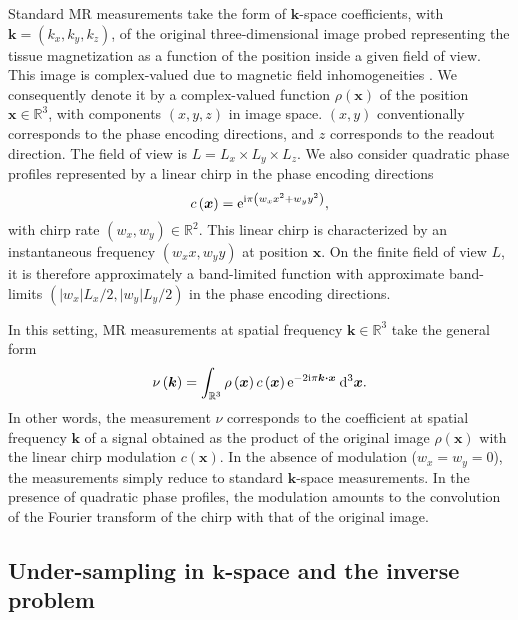\documentclass[10pt,draftcls, onecolumn]{IEEEtran}
\begin{document}
Standard MR measurements take the form of  $\bm{k}$-space coefficients, with $\bm{k}=(k_x, k_y, k_z)$, of the original three-dimensional image probed representing the tissue magnetization as a function of the position inside a given field of view. This image is complex-valued due to magnetic field inhomogeneities \cite{haake99}. We consequently denote it by a complex-valued function $\rho(\bm{x})$ of the position $\bm{x}\in\mathbb{R}^{3}$, with components $(x,y,z)$ in image space. $(x,y)$ conventionally corresponds to the phase encoding directions, and $z$ corresponds to the readout direction. The field of view is $L=L_x\times L_y\times L_z$. We also consider quadratic phase profiles represented by a linear chirp in the phase encoding directions
\begin{equation}
\label{mri0}
c\left(\bm{x}\right) = {\rm e}^{ {\rm i} \pi \left( w_x x^2 + w_y y^2\right) },
\end{equation}
with chirp rate $(w_x, w_y) \in \mathbb{R}^2$. This linear chirp is characterized by an instantaneous frequency $(w_xx, w_yy)$ at position $\bm{x}$. On the finite field of view $L$, it is therefore approximately a band-limited function with approximate band-limits $\left(\vert w_x\vert L_x/2,\vert w_y\vert L_y/2\right)$ in the phase encoding directions.

In this setting, MR measurements at spatial frequency $\bm{k}\in\mathbb{R}^{3}$ take the general form
\begin{equation}
\label{mri1}
\nu\left(\bm{k}\right) = \int_{\mathbb{R}^{3}} \rho\left(\bm{x}\right) c \left(\bm{x}\right) {\rm e}^{-2{\rm i}\pi \bm{k}\bm{\cdot}\bm{x}} \: {\rm d}^{3}\bm{x}.
\end{equation}
In other words, the measurement $\nu$ corresponds to the coefficient at spatial frequency $\bm{k}$ of a signal obtained as the product of the original image $\rho(\bm{x})$ with the linear chirp modulation $c(\bm{x})$. In the absence of modulation ($w_x=w_y=0$), the measurements simply reduce to standard $\bm{k}$-space measurements. In the presence of quadratic phase profiles, the modulation amounts to the convolution of the Fourier transform of the chirp with that of the original image.

\subsection{Under-sampling in $\bm{k}$-space and the inverse problem}
\end{document}
